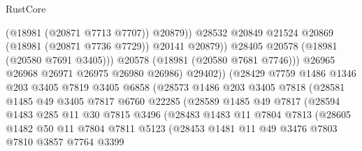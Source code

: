 \begin{lexlean}{RustCore}
\begin{coremodule}
                                    (@18981 (@20871 @7713 @7707))
                                    @20879))
                                @28532
                                @20849
                                @21524
                                @20869
                                (@18981 (@20871 @7736 @7729))
                                @20141
                                @20879))
                            @28405
                            @20578
                            (@18981 (@20580 @7691 @3405)))
                          @20578
                          (@18981 (@20580 @7681 @7746)))
                        @26965
                        @26968
                        @26971
                        @26975
                        @26980
                        @26986)
                      @29402))
                  (@28429
                    @7759
                    @1486
                    @1346
                    @203
                    @3405
                    @7819
                    @3405
                    @6858
                    (@28573
                      @1486
                      @203
                      @3405
                      @7818
                      (@28581
                        @1485
                        @49
                        @3405
                        @7817
                        @6760
                        @22285
                        (@28589
                          @1485
                          @49
                          @7817
                          (@28594
                            @1483
                            @285
                            @11
                            @30
                            @7815
                            @3496
                            (@28483
                              @1483
                              @11
                              @7804
                              @7813
                              (@28605
                                @1482
                                @50
                                @11
                                @7804
                                @7811
                                @5123
                                (@28453
                                  @1481
                                  @11
                                  @49
                                  @3476
                                  @7803
                                  @7810
                                  @3857
                                  @7764
                                  @3399

\end{coremodule}
\end{lexlean}
